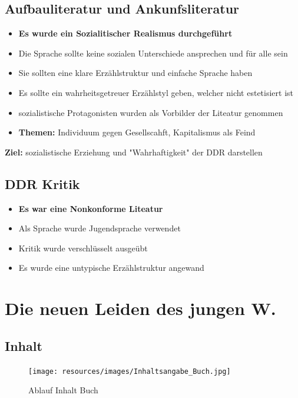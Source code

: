 \documentclass{article}
\begin{document}
\subsection{Aufbauliteratur und Ankunfsliteratur}
\begin{itemize}[parsep=0pt]
    \item \textbf{Es wurde ein Sozialitischer Realismus durchgeführt}
    \item Die Sprache sollte keine sozialen Unterschiede ansprechen und für alle sein
    \item Sie sollten eine klare Erzählstruktur und einfache Sprache haben
    \item Es sollte ein wahrheitsgetreuer Erzählstyl geben, welcher nicht estetisiert ist
    \item sozialistische Protagonisten wurden als Vorbilder der Liteatur genommen
    \item \textbf{Themen:} Individuum gegen Gesellscahft, Kapitalismus als Feind
\end{itemize}
\textbf{Ziel:} sozialistische Erziehung und "Wahrhaftigkeit" der DDR darstellen
\subsection{DDR Kritik}
\begin{itemize}[parsep=0pt]
    \item \textbf{Es war eine Nonkonforme Liteatur}
    \item Als Sprache wurde Jugendsprache verwendet
    \item Kritik wurde verschlüsselt ausgeübt
    \item Es wurde eine untypische Erzählstruktur angewand
\end{itemize}

\section{Die neuen Leiden des jungen W.}
\subsection{Inhalt}

\begin{figure}[h]
    \centering
    \texttt{[image: resources/images/Inhaltsangabe\_Buch.jpg]}
    \caption{Ablauf Inhalt Buch}
    \label{fig:Powerpoint}
\end{figure}
\end{document}
